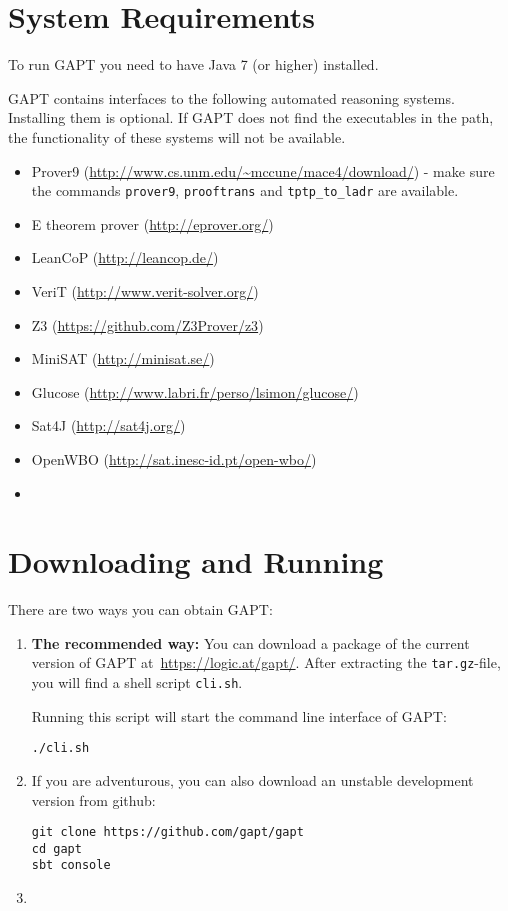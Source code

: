 \documentclass[a4paper,11pt]{article}
\begin{document}
\section{System Requirements}
\label{sec:sysreq}

To run GAPT you need to have Java 7 (or higher) installed.

GAPT contains interfaces to the following automated reasoning systems. Installing
them is optional. If GAPT does not find the executables in the path, the
functionality of these systems will not be available. 

\begin{itemize}
\item Prover9 (\url{http://www.cs.unm.edu/~mccune/mace4/download/}) - make sure
the commands \texttt{prover9}, \texttt{prooftrans} and \texttt{tptp\_to\_ladr}
are available.
\item E theorem prover (\url{http://eprover.org/})
\item LeanCoP (\url{http://leancop.de/})
\item VeriT (\url{http://www.verit-solver.org/})
\item Z3 (\url{https://github.com/Z3Prover/z3})
\item MiniSAT (\url{http://minisat.se/})
\item Glucose (\url{http://www.labri.fr/perso/lsimon/glucose/})
\item Sat4J (\url{http://sat4j.org/})
\item OpenWBO (\url{http://sat.inesc-id.pt/open-wbo/})
\item {}
\end{itemize}

\section{Downloading and Running}

There are two ways you can obtain GAPT:

\begin{enumerate}

\item {\bfseries The recommended way:}  You can download a package of the current
version of GAPT at~\url{https://logic.at/gapt/}.  After extracting
the \texttt{tar.gz}-file, you will find a shell script \texttt{cli.sh}.

Running this script will start the command line interface of GAPT:
\begin{lstlisting}
./cli.sh
\end{lstlisting}

\item If you are adventurous, you can also download an unstable development
  version from github:
\begin{lstlisting}
git clone https://github.com/gapt/gapt
cd gapt
sbt console
\end{lstlisting}

\item {}

\end{enumerate}
\end{document}
